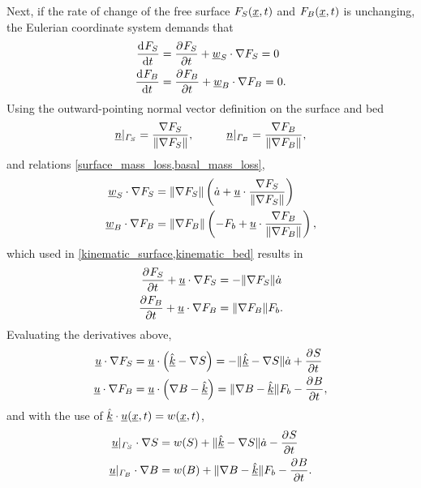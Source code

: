 Next, if the rate of change of the free surface $F_S(\underline{x},t)$ and $F_B(\underline{x},t)$ is unchanging, the Eulerian coordinate system demands that
\begin{align}
  \label{kinematic_surface}
  \frac{\mathrm{d}{^{}} F_S}{\mathrm{d} t{^{}} } &= \frac{\partial{^{}} F_S}{\partial t{^{}} } + \underline{w}_S \cdot \nabla F_S = 0 \\
  \label{kinematic_bed}
  \frac{\mathrm{d}{^{}} F_B}{\mathrm{d} t{^{}} } &= \frac{\partial{^{}} F_B}{\partial t{^{}} } + \underline{w}_B \cdot \nabla F_B = 0.
\end{align}
Using the outward-pointing normal vector definition on the surface and bed
\begin{align}
  \label{normal_vector}
  \rankone{n} |_{\Gamma_S} = \frac{\nabla F_S}{\Vert \nabla F_S \Vert}, \hspace{10mm}
  \rankone{n} |_{\Gamma_B} = \frac{\nabla F_B}{\Vert \nabla F_B \Vert},
\end{align}
and relations \cref{surface_mass_loss,basal_mass_loss},
\begin{align*}
  \underline{w}_S \cdot \nabla F_S &= \Vert \nabla F_S \Vert \left( \dot{a} + \underline{u} \cdot \frac{\nabla F_S}{\Vert \nabla F_S \Vert} \right) \\
  \underline{w}_B \cdot \nabla F_B &= \Vert \nabla F_B \Vert \left( - F_b + \underline{u} \cdot \frac{\nabla F_B}{\Vert \nabla F_B \Vert} \right),
\end{align*}
which used in \cref{kinematic_surface,kinematic_bed} results in  
\begin{align*}
  \frac{\partial{^{}} F_S}{\partial t{^{}} } + \underline{u} \cdot \nabla F_S &= - \Vert \nabla F_S \Vert \dot{a} \\
  \frac{\partial{^{}} F_B}{\partial t{^{}} } + \underline{u} \cdot \nabla F_B &= \Vert \nabla F_B \Vert F_b.
\end{align*}
Evaluating the derivatives above,
\begin{align*}
  \underline{u} \cdot \nabla F_S &= \underline{u} \cdot \left( \hat{\underline{k}} - \nabla S \right) = - \Vert \hat{\underline{k}} - \nabla S \Vert \dot{a} + \frac{\partial{^{}} S}{\partial t{^{}} } \\
  \underline{u} \cdot \nabla F_B &= \underline{u} \cdot \left( \nabla B - \hat{\underline{k}} \right) = \Vert \nabla B - \hat{\underline{k}} \Vert F_b - \frac{\partial{^{}} B}{\partial t{^{}} },
\end{align*}
and with the use of $\hat{\underline{k}} \cdot \underline{u}(\underline{x},t) = w(\underline{x},t)$, 
\begin{align}
  \label{u_dot_gradS}
  \underline{u} |_{\varGamma_S} \cdot \nabla S &= w(S) + \Vert \hat{\underline{k}} - \nabla S \Vert \dot{a} - \frac{\partial{^{}} S}{\partial t{^{}} } \\
  \label{u_dot_gradB}
  \underline{u} |_{\varGamma_B} \cdot \nabla B &= w(B) + \Vert \nabla B - \hat{\underline{k}} \Vert F_b - \frac{\partial{^{}} B}{\partial t{^{}} }.
\end{align}

